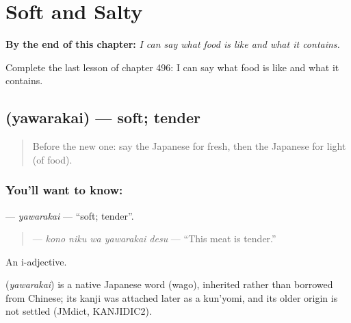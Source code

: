 
\chapter{Soft and Salty}
\label{ch:ja-soft-and-salty}

\begin{chapteropening}
\textbf{By the end of this chapter:} \emph{I can say what food is like and what it contains.}

Complete the last lesson of chapter 496: I can say what food is like and what it contains.
\end{chapteropening}

\section[\texorpdfstring{\ja{やわらかい} (yawarakai)}{やわらかい (yawarakai)}]{ (yawarakai) — soft; tender}

\label{lesson:JA-C496-yawarakai}



\begin{quote}
Before the new one: say the Japanese for fresh, then the Japanese for light (of food).
\end{quote}

\subsection*{You'll want to know: }
\textbf{} — \emph{yawarakai} — \textquotedblleft{}soft; tender\textquotedblright{}.

\begin{quote}
\textbf{  } — \emph{kono niku wa yawarakai desu} — \textquotedblleft{}This meat is tender.\textquotedblright{}
\end{quote}

An i-adjective.

\begin{cousinweb}
\textbf{} (\emph{yawarakai}) is a native Japanese word (wago), inherited rather than borrowed from Chinese; its kanji was attached later as a kun'yomi, and its older origin is not settled (JMdict, KANJIDIC2).
\end{cousinweb}


